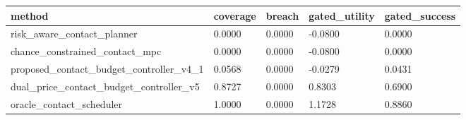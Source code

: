 \begin{tabular}{lllll}
\toprule
method & coverage & breach & gated\_utility & gated\_success \\
\midrule
risk\_aware\_contact\_planner & 0.0000 & 0.0000 & -0.0800 & 0.0000 \\
chance\_constrained\_contact\_mpc & 0.0000 & 0.0000 & -0.0800 & 0.0000 \\
proposed\_contact\_budget\_controller\_v4\_1 & 0.0568 & 0.0000 & -0.0279 & 0.0431 \\
dual\_price\_contact\_budget\_controller\_v5 & 0.8727 & 0.0000 & 0.8303 & 0.6900 \\
oracle\_contact\_scheduler & 1.0000 & 0.0000 & 1.1728 & 0.8860 \\
\bottomrule
\end{tabular}

